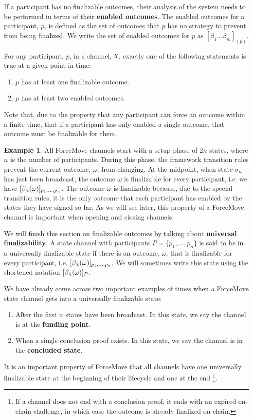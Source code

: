 \documentclass{article}
\DeclareRobustCommand{\rchi}{{\mathpalette\irchi\relax}}
\newcommand{\irchi}[2]{\raisebox{\depth}{$#1\chi$}} %
\theoremstyle{definition}
\newtheorem{example}{Example}[section]
\newcommand{\enf}[1]{[#1]}
\begin{document}
If a participant has no finalizable outcomes, their analysis of the system needs to be performed
in terms of their \textbf{enabled outcomes}.
The enabled outcomes for a participant, $p$, is defined as the set of outcomes that $p$ has
no strategy to prevent from being finalized.
We write the set of enabled outcomes for $p$ as $\enf{\beta_1 \dots \beta_m}_{(p)}$.

For any participant, $p$, in a channel, $\rchi$, exactly one of the following statements is
true at a given point in time:
\begin{enumerate}
  \item $p$ has at least one finalizable outcome.
  \item $p$ has at least two enabled outcomes.
\end{enumerate}
Note that, due to the property that any participant can force an outcome within a finite time,
that if a participant has only enabled a single outcome, that outcome must be finalizable for them.

\begin{example}{}
  All ForceMove channels start with a setup phase of $2n$ states, where $n$ is the number of participants.
  During this phase, the framework transition rules prevent the current outcome, $\omega$, from changing.
  At the midpoint, when state $\sigma_n$ has just been broadcast, the outcome
  $\omega$ is finalizable for every participant, i.e. we have
  $\enf{\beta_\rchi(\omega)}_{p_1, \dots, p_n}$.
  The outcome $\omega$ is finalizable because, due to the special transition rules,
  it is the only outcome that each participant has enabled by the states they have signed so far.
  As we will see later, this property of a ForceMove channel is important when opening and
  closing channels.
\end{example}

We will finish this section on finalizable outcomes by talking about \textbf{universal finalizability}.
A state channel with participants $P = \{p_1, \dots, p_n\}$ is said to be in a universally finalizable
state if there is an outcome, $\omega$, that is finalizable for every participant, i.e.
$\enf{\beta_\rchi(\omega)}_{p_1,\dots, p_n}$.
We will sometimes write this state using the shortened notation $\enf{\beta_\rchi(\omega)}_P$.

We have already come across two important examples of times when a ForceMove state channel
gets into a universally finalizable state:
\begin{enumerate}
  \item After the first $n$ states have been broadcast. In this state, we say the channel is at the \textbf{funding point}.
  \item When a single conclusion proof exists. In this state, we say the channel is in the \textbf{concluded state}.
\end{enumerate}
It is an important property of ForceMove that all channels have one universally finalizable
state at the beginning of their lifecycle and one at the end
\footnote{If a channel does not end with a conclusion proof, it ends with an expired on-chain challenge,
in which case the outcome is already finalized on-chain.}.
\end{document}
